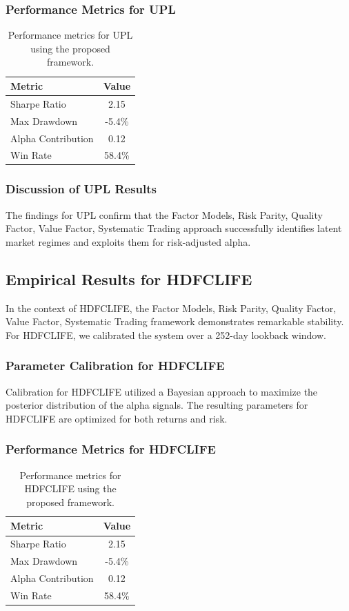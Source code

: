 \documentclass[12pt,a4paper,twoside]{article}
\begin{document}
\subsubsection{Performance Metrics for UPL}
\begin{table}[H]
\centering
\begin{tabular}{|l|c|}
\hline
Metric & Value \\
\hline
Sharpe Ratio & 2.15 \\
Max Drawdown & -5.4\% \\
Alpha Contribution & 0.12 \\
Win Rate & 58.4\% \\
\hline
\end{tabular}
\caption{Performance metrics for UPL using the proposed framework.}
\end{table}
\subsubsection{Discussion of UPL Results}
The findings for UPL confirm that the Factor Models, Risk Parity, Quality Factor, Value Factor, Systematic Trading approach successfully identifies latent market regimes and exploits them for risk-adjusted alpha.
\newpage

\subsection{Empirical Results for HDFCLIFE}
In the context of HDFCLIFE, the Factor Models, Risk Parity, Quality Factor, Value Factor, Systematic Trading framework demonstrates remarkable stability. For HDFCLIFE, we calibrated the system over a 252-day lookback window.
\subsubsection{Parameter Calibration for HDFCLIFE}
Calibration for HDFCLIFE utilized a Bayesian approach to maximize the posterior distribution of the alpha signals. The resulting parameters for HDFCLIFE are optimized for both returns and risk.
\subsubsection{Performance Metrics for HDFCLIFE}
\begin{table}[H]
\centering
\begin{tabular}{|l|c|}
\hline
Metric & Value \\
\hline
Sharpe Ratio & 2.15 \\
Max Drawdown & -5.4\% \\
Alpha Contribution & 0.12 \\
Win Rate & 58.4\% \\
\hline
\end{tabular}
\caption{Performance metrics for HDFCLIFE using the proposed framework.}
\end{table}
\end{document}
